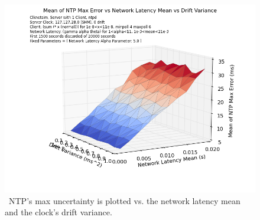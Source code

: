 \begin{figure}[h]
  \caption{~NTP's max uncertainty is plotted vs. the network latency mean and the clock's drift variance.}
  \label{fig:mean-uncertainty_latency-mean_drift-variance}
  \includegraphics[width=0.8\linewidth]{mean_max_err-mean_latency-drift_variance.png}
\end{figure}








